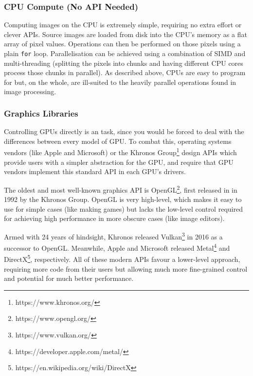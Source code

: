 \documentclass[12pt]{article}
\begin{document}
\subsubsection{CPU Compute (No API Needed)}

Computing images on the CPU is extremely simple, requiring no extra effort or clever APIs.  Source
images are loaded from disk into the CPU's memory as a flat array of pixel values.  Operations can
then be performed on those pixels using a plain \verb|for| loop.  Parallelisation can be achieved
using a combination of SIMD and multi-threading (splitting the pixels into chunks and having
different CPU cores process those chunks in parallel).  As described above, CPUs are easy to program
for but, on the whole, are ill-suited to the heavily parallel operations found in image processing.

\subsubsection{Graphics Libraries}

Controlling GPUs directly is an task, since you would be forced to deal with the differences between
every model of GPU.  To combat this, operating systems vendors (like Apple and Microsoft) or the
Khronos Group\footnote{https://www.khronos.org/} design APIs which provide users with a simpler
abstraction for the GPU, and require that GPU vendors implement this standard API in each GPU's
drivers.

The oldest and most well-known graphics API is OpenGL\footnote{https://www.opengl.org/}, first
released in in 1992 by the Khronos Group.  OpenGL is very high-level, which makes it easy to use for
simple cases (like making games) but lacks the low-level control required for achieving high
performance in more obscure cases (like image editors).

Armed with 24 years of hindsight, Khronos released Vulkan\footnote{https://www.vulkan.org/} in 2016
as a successor to OpenGL.  Meanwhile, Apple and Microsoft released
Metal\footnote{https://developer.apple.com/metal/} and
DirectX\footnote{https://en.wikipedia.org/wiki/DirectX}, respectively.  All of these modern APIs
favour a lower-level approach, requiring more code from their users but allowing much more
fine-grained control and potential for much better performance.
\end{document}
